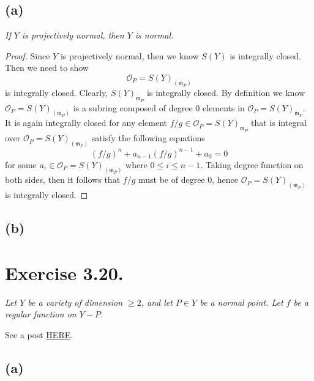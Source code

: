 \subsection{(a)}
\textit{If $Y$ is projectively normal, then $Y$ is normal.}

\begin{proof}
Since $Y$ is projectively normal, then we know $S(Y)$ is integrally closed. Then we need to show 
\[\mathscr O_P=S(Y)_{(\mathfrak m_P)}\] is integrally closed. Clearly, $S(Y)_{\mathfrak m_P}$ is integrally closed. By definition we know $\mathscr O_P=S(Y)_{(\mathfrak m_P)}$ is a subring composed of degree $0$ elements in $\mathscr O_P=S(Y)_{\mathfrak m_P}$. It is again integrally closed for any element $f/g\in \mathscr O_P=S(Y)_{\mathfrak m_P}$ that is integral over $\mathscr O_P=S(Y)_{(\mathfrak m_P)}$ satisfy the following equations 
\[(f/g)^n+a_{n-1}(f/g)^{n-1}+a_0=0\] for some $a_{i}\in \mathscr O_P=S(Y)_{(\mathfrak m_P)}$ where $0\leq i\leq n-1$. Taking degree function on both sides, then it follows that $f/g$ must be of degree $0$, hence $\mathscr O_P=S(Y)_{(\mathfrak m_P)}$ is integrally closed. 

\end{proof}

\subsection{(b)}
\textit{}


\section{Exercise 3.20.}
\textit{Let $Y$ be a variety of dimension $\geq 2$, and let $P\in Y$ be a normal point. Let $f$ be a regular function on $Y-P$.}

See a post \href{https://math.stackexchange.com/questions/1791250/regular-functions-extension-to-normal-points-of-varieties}{HERE}. 

\subsection{(a)}